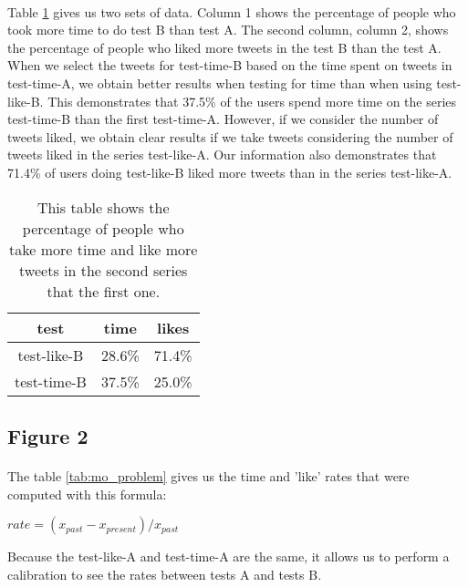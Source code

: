 \paragraph{}
Table \ref{tab:mo_money} gives us two sets of data. Column 1 shows the percentage of people who took more time to do test B than test A. The second column, column 2, shows the percentage of people who liked more tweets in the test B than the test A.\\
When we select the tweets for test-time-B based on the time spent on tweets in test-time-A, we obtain better results when testing for time than when using test-like-B. This demonstrates that 37.5\% of the users spend more time on the series test-time-B than the first test-time-A. However, if we consider the number of tweets liked, we obtain clear results if we take tweets considering the number of tweets liked in the series test-like-A. Our information also demonstrates that 71.4\% of users doing test-like-B liked more tweets than in the series test-like-A.

\begin{table}[h]
\centering
\begin{tabular}{ccc}
\toprule
test & time & likes \\ 
\midrule
test-like-B & 28.6\%	& 71.4\% \\
test-time-B & 37.5\% & 25.0\% \\
\bottomrule 
\end{tabular}
\caption[More time \& likes]{This table shows the percentage of people who take more time and like more tweets in the second series that the first one.}
\label{tab:mo_money}
\end{table}

\subsection{Figure 2}

\paragraph{}
The table \ref{tab:mo_problem} gives us the time and 'like' rates that were computed with this formula:

\begin{center}
$rate={(x_{past}-x_{present})}/{x_{past}}$
\end{center}

Because the test-like-A and test-time-A are the same, it allows us to perform a calibration to see the rates between tests A and tests B.


